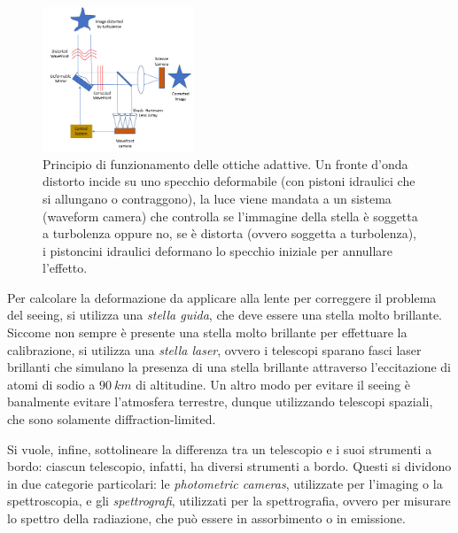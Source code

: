 \begin{figure}
\centering
\includegraphics[width=0.4\textwidth]{immagini/ottiche-adattive.png}
\caption{Principio di funzionamento delle ottiche adattive. Un fronte d’onda distorto incide su uno specchio deformabile (con pistoni idraulici che si allungano o contraggono), la luce viene mandata a un sistema (waveform camera) che controlla se l’immagine della stella è soggetta a turbolenza oppure no, se è distorta (ovvero soggetta a turbolenza), i pistoncini idraulici deformano lo specchio iniziale per annullare l'effetto.}
\label{fig:ottiche-adattive}
\end{figure}

Per calcolare la deformazione da applicare alla lente per correggere il problema del seeing, si utilizza una \emph{stella guida}, che deve essere una stella molto brillante. Siccome non sempre è presente una stella molto brillante per effettuare la calibrazione, si utilizza una \emph{stella laser}, ovvero i telescopi sparano fasci laser brillanti che simulano la presenza di una stella brillante attraverso l'eccitazione di atomi di sodio a $\SI{90}{km}$ di altitudine. Un altro modo per evitare il seeing è banalmente evitare l'atmosfera terrestre, dunque utilizzando telescopi spaziali, che sono solamente diffraction-limited.

Si vuole, infine, sottolineare la differenza tra un telescopio e i suoi strumenti a bordo: ciascun telescopio, infatti, ha diversi strumenti a bordo. Questi si dividono in due categorie particolari: le \emph{photometric cameras}, utilizzate per l'imaging o la spettroscopia, e gli \emph{spettrografi}, utilizzati per la spettrografia, ovvero per misurare lo spettro della radiazione, che può essere in assorbimento o in emissione.